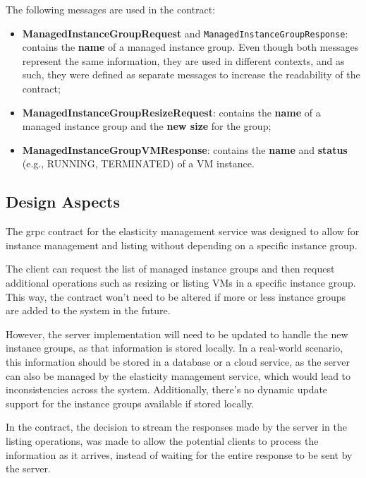 The following messages are used in the contract:

\begin{itemize}
    \item \textbf{ManagedInstanceGroupRequest} and \texttt{ManagedInstanceGroupResponse}:
    contains the \textbf{name} of a managed instance group.
    Even though both messages represent the same information, they are used in different contexts,
    and as such, they were defined as separate messages to increase the readability of the contract;
    \item \textbf{ManagedInstanceGroupResizeRequest}:
    contains the \textbf{name} of a managed instance group and the \textbf{new size} for the group;
    \item \textbf{ManagedInstanceGroupVMResponse}: contains the \textbf{name} and \textbf{status} (e.g., RUNNING, TERMINATED) of a VM instance.
\end{itemize}

\subsection{Design Aspects}\label{subsec:elasticity-management-design-aspects}

The grpc contract for the elasticity management service was designed
to allow for instance management and listing without depending on a specific instance group.

The client can request the list of managed instance groups and then request additional operations such as resizing or listing VMs in a specific instance group.
This way, the contract won't need to be altered if more or less instance groups are added to the system in the future.

However, the server implementation will need to be updated to handle the new instance groups,
as that information is stored locally.
In a real-world scenario, this information should be stored in a database or a cloud service, as the server can also be managed by the elasticity management service,
which would lead to inconsistencies across the system.
Additionally, there's no dynamic update support for the instance groups available if stored locally.

In the contract, the decision to stream the responses made by the server in the listing operations,
was made to allow the potential clients to process the information as it arrives,
instead of waiting for the entire response to be sent by the server.
